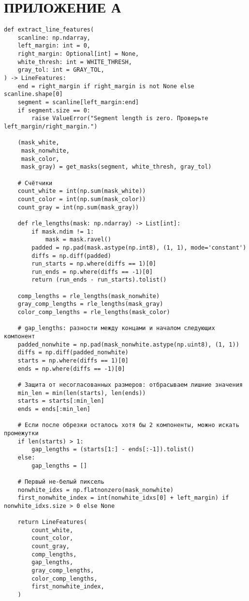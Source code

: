 \section*{ПРИЛОЖЕНИЕ А}


% 

\begin{lstlisting}[caption={Функция для выделения характеристик строки пикселей}, label={lst:elf}]
def extract_line_features(
    scanline: np.ndarray,
    left_margin: int = 0,
    right_margin: Optional[int] = None,
    white_thresh: int = WHITE_THRESH,
    gray_tol: int = GRAY_TOL,
) -> LineFeatures:
    end = right_margin if right_margin is not None else scanline.shape[0]
    segment = scanline[left_margin:end]
    if segment.size == 0:
        raise ValueError("Segment length is zero. Проверьте left_margin/right_margin.")

    (mask_white,
     mask_nonwhite,
     mask_color,
     mask_gray) = get_masks(segment, white_thresh, gray_tol)

    # Счётчики
    count_white = int(np.sum(mask_white))
    count_color = int(np.sum(mask_color))
    count_gray = int(np.sum(mask_gray))

    def rle_lengths(mask: np.ndarray) -> List[int]:
        if mask.ndim != 1:
            mask = mask.ravel()
        padded = np.pad(mask.astype(np.int8), (1, 1), mode='constant')
        diffs = np.diff(padded)
        run_starts = np.where(diffs == 1)[0]
        run_ends = np.where(diffs == -1)[0]
        return (run_ends - run_starts).tolist()

    comp_lengths = rle_lengths(mask_nonwhite)
    gray_comp_lengths = rle_lengths(mask_gray)
    color_comp_lengths = rle_lengths(mask_color)

    # gap_lengths: разности между концами и началом следующих компонент
    padded_nonwhite = np.pad(mask_nonwhite.astype(np.uint8), (1, 1))
    diffs = np.diff(padded_nonwhite)
    starts = np.where(diffs == 1)[0]
    ends = np.where(diffs == -1)[0]

    # Защита от несогласованных размеров: отбрасываем лишние значения
    min_len = min(len(starts), len(ends))
    starts = starts[:min_len]
    ends = ends[:min_len]

    # Если после обрезки осталось хотя бы 2 компоненты, можно искать промежутки
    if len(starts) > 1:
        gap_lengths = (starts[1:] - ends[:-1]).tolist()
    else:
        gap_lengths = []

    # Первый не-белый пиксель
    nonwhite_idxs = np.flatnonzero(mask_nonwhite)
    first_nonwhite_index = int(nonwhite_idxs[0] + left_margin) if nonwhite_idxs.size > 0 else None

    return LineFeatures(
        count_white,
        count_color,
        count_gray,
        comp_lengths,
        gap_lengths,
        gray_comp_lengths,
        color_comp_lengths,
        first_nonwhite_index,
    )
\end{lstlisting}

